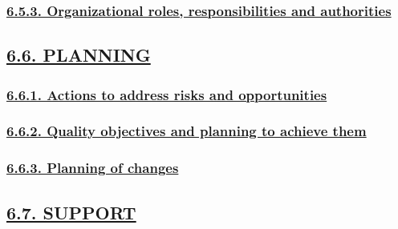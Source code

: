\documentclass[
]{article}
\begin{document}
\hypertarget{organizational-roles-responsibilities-and-authorities}{%
\subsubsection{\texorpdfstring{\protect\hyperlink{organizational-roles-responsibilities-and-authorities-1}{6.5.3.
Organizational roles, responsibilities and
authorities}}{6.5.3. Organizational roles, responsibilities and authorities}}\label{organizational-roles-responsibilities-and-authorities}}

\hypertarget{planning}{%
\subsection{\texorpdfstring{\protect\hyperlink{planning-1}{6.6.
PLANNING}}{6.6. PLANNING}}\label{planning}}

\hypertarget{actions-to-address-risks-and-opportunities}{%
\subsubsection{\texorpdfstring{\protect\hyperlink{actions-to-address-risks-and-opportunities-1}{6.6.1.
Actions to address risks and
opportunities}}{6.6.1. Actions to address risks and opportunities}}\label{actions-to-address-risks-and-opportunities}}

\hypertarget{quality-objectives-and-planning-to-achieve-them}{%
\subsubsection{\texorpdfstring{\protect\hyperlink{quality-objectives-and-planning-to-achieve-them-1}{6.6.2.
Quality objectives and planning to achieve
them}}{6.6.2. Quality objectives and planning to achieve them}}\label{quality-objectives-and-planning-to-achieve-them}}

\hypertarget{planning-of-changes}{%
\subsubsection{\texorpdfstring{\protect\hyperlink{planning-of-changes-1}{6.6.3.
Planning of
changes}}{6.6.3. Planning of changes}}\label{planning-of-changes}}

\hypertarget{support}{%
\subsection{\texorpdfstring{\protect\hyperlink{support-1}{6.7.
SUPPORT}}{6.7. SUPPORT}}\label{support}}
\end{document}
